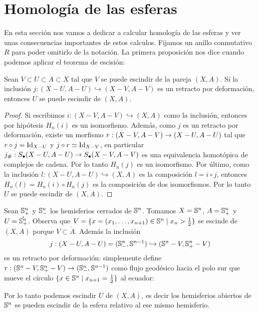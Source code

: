 \documentclass[../../topologia_algebraica]{subfiles}
\begin{document}
\section{Homolog\'ia de las esferas}

En esta secci\'on nos vamos a dedicar a calcular homolog\'ia de las esferas y
ver unas consecuencias importantes de estos calculos. Fijamos un anillo
conmutativo $R$ para poder omitirlo de la notaci\'on. La primera proposici\'on
nos dice cuando podemos aplicar el teorema de escisi\'on:

\begin{prop}
  Sean $V\subset U\subset A\subset X$ tal que $V$ se puede escindir de la pareja
  $(X,A)$. Si la inclusi\'on $j:(X-U,A-U)\hookrightarrow (X-V,A-V)$ es un retracto
  por deformaci\'on, entonces $U$ se puede escindir de $(X,A)$.
\end{prop}
\begin{proof}
  Si escribimos $i:(X-V,A-V)\hookrightarrow(X,A)$ como la inclusi\'on, entonces por
  hip\'otesis $H_n(i)$ es un isomorfismo. Adem\'as, como $j$ es un retracto por
  deformaci\'on, existe un morfismo $r:(X-V,A-V)\rightarrow(X-U,A-U)$ tal que $r\circ j=\text{Id}_{X-U}$
  y $j\circ r\simeq\text{Id}_{X-V}$, en particular $j_{\#}:S_{\bullet}(X-U,A-U)\rightarrow S_{\bullet}(X-V,A-V)$
  es una equivalencia homot\'opica de complejos de cadena. Por lo tanto $H_n(j)$ es un
  isomorfismo. Por \'ultimo, como la inclusi\'on $l:(X-U,A-U)\hookrightarrow(X,A)$ es
  la composici\'on $l=i\circ j$, entonces $H_n(l)=H_n(i)\circ H_n(j)$ es la composici\'on
  de dos isomorfismos. Por lo tanto $U$ se puede escindir de $(X,A)$.
\end{proof}

\begin{ejemplo}
  Sean $\mathbb{S}^n_+$ y $\mathbb{S}^n_-$ los hemisferios cerrados de $\mathbb{S}^n$. Tomamos $X=\mathbb{S}^n$,
  $A=\mathbb{S}^n_+$ y $U=\mathring{\mathbb{S}^n_+}$. Observa que
  $V=\{x=(x_1,\ldots,x_{n+1})\in\mathbb{S}^n\mid x_n>\tfrac{1}{2}\}$ se escinde de $(X,A)$
  porque $V\subset\mathring{A}$. Adem\'as la inclusi\'on
  \[
    j:(X-U,A-U)=(\mathbb{S}^n_-,\mathbb{S}^{n-1})\hookrightarrow (\mathbb{S}^n-V,\mathbb{S}^n_+-V)
  \]
  es un retracto por deformaci\'on: simplemente define
  $r:(\mathbb{S}^n-V,\mathbb{S}^n_+-V)\rightarrow(\mathbb{S}^n_-,\mathbb{S}^{n-1})$ como flujo geod\'esico hacia el polo sur
  que mueve el c\'irculo $\{x\in\mathbb{S}^n\mid x_{n+1}=\tfrac{1}{2}\}$ al ecuador:
\begin{figure}[h!]%
  \centering
\end{figure}%

Por lo tanto podemos escindir $U$ de $(X,A)$, es decir los hemisferios abiertos de
$\mathbb{S}^n$ se pueden escindir de la esfera relativo al ese mismo hemisferio.
\end{ejemplo}
\end{document}
